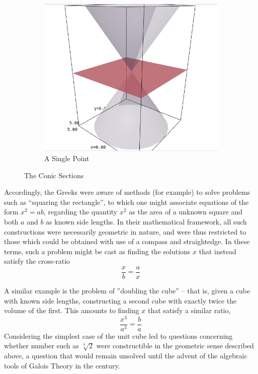 \documentclass{article}
\theoremstyle{definition}
\begin{document}
\begin{figure}[H]
~ %
\begin{subfigure}[b]{0.3\textwidth}
\includegraphics[width=\textwidth]{Selection_054}
\caption{A Single Point}
\label{fig:mouse4}
\end{subfigure}
\caption{The Conic Sections}\label{fig:animals27}
\end{figure}

Accordingly, the Greeks were aware of methods (for example) to solve
problems such as ``squaring the rectangle'', to which one might associate
equations of the form \(x^2 = ab\), regarding the quantity \(x^2\) as
the area of a unknown square and both \(a\) and \(b\) as known side
lengths. In their mathematical framework, all such constructions were
necessarily geometric in nature, and were thus restricted to those which
could be obtained with use of a compass and straightedge. In these
terms, such a problem might be cast as finding the solutions \(x\) that instead satisfy the cross-ratio \[\frac{x}{b} = \frac{a}{x}\]

A similar example is the problem of ''doubling the cube'' -- that is, given a cube
with known side lengths, constructing a second cube with exactly twice
the volume of the first. This amounts to finding \(x\) that satisfy a
similar ratio, \[\frac{x^3}{a^3} = \frac{b}{a}\] Considering the
simplest case of the unit cube led to questions concerning whether
number such as \(\sqrt[3]{2}\) were constructible in the geometric sense
described above, a question that would remain unsolved until the advent
of the algebraic tools of Galois Theory in the  century.
\end{document}

